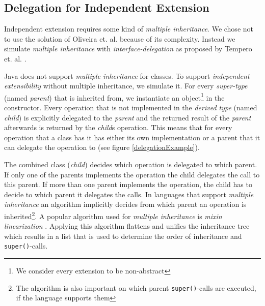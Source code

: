 \documentclass{report}
\begin{document}

\subsection{Delegation for Independent Extension}

\label{backgroundVisibility}

Independent extension requires some kind of \emph{multiple inheritance}. We chose not to use the solution of Oliveira et. al. because of its complexity. Instead we simulate \emph{multiple inheritance} with \emph{interface-delegation} as proposed by Tempero et. al. \cite{Tempero-Multiple-2000}.

Java does not support \emph{multiple inheritance} for classes. To support \emph{independent extensibility} without multiple inheritance, we simulate it. For every \emph{super-type} (named \emph{parent}) that is inherited from, we instantiate an object\footnote{We consider every extension to be non-abstract} in the constructor. Every operation that is not implemented in the \emph{derived type} (named \emph{child}) is explicitly delegated to the \emph{parent} and the returned result of the \emph{parent} afterwards is returned by the \emph{child}s operation. This means that for every operation that a class has it has either its own implementation or a parent that it can delegate the operation to (see figure \ref{delegationExample}).

The combined class (\emph{child}) decides which operation is delegated to which parent. If only one of the parents implements the operation the child delegates the call to this parent. If more than one parent implements the operation, the child has to decide to which parent it delegates the calls. In languages that support \emph{multiple inheritance} an algorithm implicitly decides from which parent an operation is inherited\footnote{The algorithm is also important on which parent \lstinline{super()}-calls are executed, if the language supports them}. A popular algorithm used for \emph{multiple inheritance} is \emph{mixin linearization} \cite{Bracha-Mixin-1990}. Applying this algorithm flattens and unifies the inheritance tree which results in a list that is used to determine the order of inheritance and \lstinline{super()}-calls.
\end{document}
